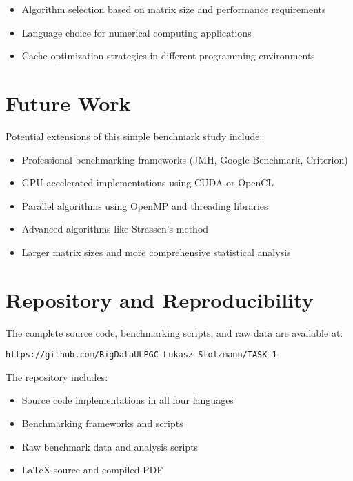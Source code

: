 \documentclass[11pt,a4paper]{article}
\begin{document}
\begin{itemize}
    \item Algorithm selection based on matrix size and performance requirements
    \item Language choice for numerical computing applications
    \item Cache optimization strategies in different programming environments
\end{itemize}

\section{Future Work}

Potential extensions of this simple benchmark study include:

\begin{itemize}
    \item Professional benchmarking frameworks (JMH, Google Benchmark, Criterion)
    \item GPU-accelerated implementations using CUDA or OpenCL
    \item Parallel algorithms using OpenMP and threading libraries
    \item Advanced algorithms like Strassen's method
    \item Larger matrix sizes and more comprehensive statistical analysis
\end{itemize}

\section{Repository and Reproducibility}

The complete source code, benchmarking scripts, and raw data are available at:

\texttt{https://github.com/BigDataULPGC-Lukasz-Stolzmann/TASK-1}

The repository includes:
\begin{itemize}
    \item Source code implementations in all four languages
    \item Benchmarking frameworks and scripts
    \item Raw benchmark data and analysis scripts
    \item LaTeX source and compiled PDF
\end{itemize}



\end{document}
